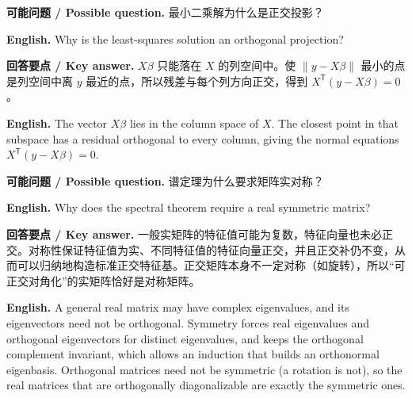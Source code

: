 \documentclass[UTF8,11pt,a4paper]{ctexart}
\newcommand{\EN}[1]{\par\noindent\textbf{English.} #1\par}
\newcommand{\ASK}[4]{\par\noindent\textbf{可能问题 / Possible question.} #1\par\EN{#2}\noindent\textbf{回答要点 / Key answer.} #3\par\EN{#4}\medskip}
\begin{document}
\ASK{最小二乘解为什么是正交投影？}{Why is the least-squares solution an orthogonal projection?}{$X\beta$ 只能落在 $X$ 的列空间中。使 $\|y-X\beta\|$ 最小的点是列空间中离 $y$ 最近的点，所以残差与每个列方向正交，得到 $X^{\mathsf T}(y-X\beta)=0$。}{The vector $X\beta$ lies in the column space of $X$. The closest point in that subspace has a residual orthogonal to every column, giving the normal equations $X^{\mathsf T}(y-X\beta)=0$.}
\ASK{谱定理为什么要求矩阵实对称？}{Why does the spectral theorem require a real symmetric matrix?}{一般实矩阵的特征值可能为复数，特征向量也未必正交。对称性保证特征值为实、不同特征值的特征向量正交，并且正交补仍不变，从而可以归纳地构造标准正交特征基。正交矩阵本身不一定对称（如旋转），所以“可正交对角化”的实矩阵恰好是对称矩阵。}{A general real matrix may have complex eigenvalues, and its eigenvectors need not be orthogonal. Symmetry forces real eigenvalues and orthogonal eigenvectors for distinct eigenvalues, and keeps the orthogonal complement invariant, which allows an induction that builds an orthonormal eigenbasis. Orthogonal matrices need not be symmetric (a rotation is not), so the real matrices that are orthogonally diagonalizable are exactly the symmetric ones.}
\end{document}

